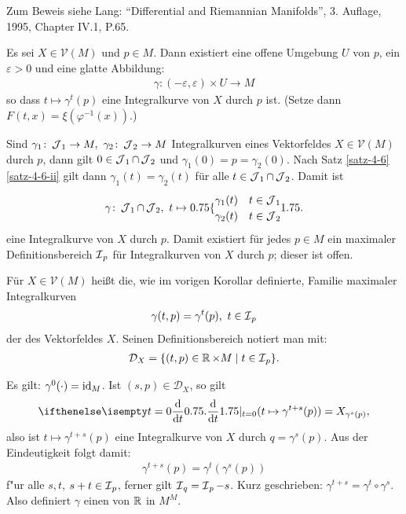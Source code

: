 Zum Beweis siehe Lang: "`Differential and Riemannian Manifolds"', 3. Auflage, 1995, Chapter IV.1, P.65\cite{lang1995differential}.

\begin{Kor}\label{korollar-4-7}
  Es sei $X \in \mathcal V(M)$ und $p \in M$. Dann existiert eine offene Umgebung $U$ von $p$, ein $\varepsilon > 0$ und eine glatte Abbildung:
  \begin{align*}
    \gamma\colon(-\varepsilon,\varepsilon) \times U \to M
  \end{align*}
  so dass $t \mapsto \gamma^t(p)$ eine Integralkurve von $X$ durch $p$ ist. (Setze dann $F(t,x) = \xi(\varphi^{-1}(x))$.)
\end{Kor}

\begin{Kor}\label{korollar-4-8}
  Sind $\gamma_1 \colon \operatorname{\mathcal{J}}_1 \to M, \ \gamma_2 \colon \operatorname{\mathcal{J}}_2 \to M$ Integralkurven eines Vektorfeldes $X \in \mathcal V(M)$ durch $p$, dann gilt $0 \in \operatorname{\mathcal{J}}_1 \cap \operatorname{\mathcal{J}}_2$ und $\gamma_1(0)= p = \gamma_2(0)$.
  Nach Satz \ref{satz-4-6} \ref{satz-4-6-ii} gilt dann $\gamma_1(t) = \gamma_2(t)$ für alle $t \in \operatorname{\mathcal{J}}_1 \cap \operatorname{\mathcal{J}}_2$. Damit ist
  \begin{align*}
    \gamma \colon \calJ_1 \cap \calJ_2, \ t \mapsto 
    \begin{cases}
      \gamma_1(t) & t \in \calJ_1\\
      \gamma_2(t) & t \in \calJ_2
    \end{cases}
  \end{align*}
  eine Integralkurve von $X$ durch $p$.
  Damit existiert für jedes $p \in M$ ein maximaler Definitionsbereich $\operatorname{\mathcal{I}}_p$ für Integralkurven von $X$ durch $p$; dieser ist offen.
\end{Kor}

\begin{dfn}
  Für $X \in \mathcal V(M)$ heißt die, wie im vorigen Korollar definierte, Familie maximaler Integralkurven
  \begin{align*}
    \gamma(t,p) = \gamma^t(p),\ t \in \operatorname{\mathcal{I}}_p
  \end{align*}
  der  des Vektorfeldes $X$.
  Seinen Definitionsbereich notiert man mit:
  \begin{align*}
    \mathcal D_X = \{(t,p) \in \operatorname{\mathbb{R}} \times M \mid t \in \operatorname{\mathcal{I}}_p\}.
  \end{align*}
\end{dfn}

\begin{bem}
  Es gilt: $\gamma^0(\cdot) = \operatorname{id}_M$. Ist $(s,p) \in \mathcal D_{X}$, so gilt
  \[ \difffrac[t=0]{}{t}(t \mapsto \gamma^{t+s}(p)) = X_{\gamma^s(p)}, \]
  also ist $t \mapsto \gamma^{t+s}(p)$ eine Integralkurve von $X$ durch $q = \gamma^s(p)$. Aus der Eindeutigkeit folgt damit:
  \begin{align*}
    \gamma^{t+s}(p) = \gamma^t(\gamma^s(p))
  \end{align*}
  f"ur alle $s, t$, $s+t \in \operatorname{\mathcal{I}}_p$, ferner gilt $\operatorname{\mathcal{I}}_q = \operatorname{\mathcal{I}}_p - s$. Kurz geschrieben: $\gamma^{t+s} = \gamma^t \circ \gamma^s$. Also definiert $\gamma$ einen  von $\operatorname{\mathbb{R}}$ in $M^M$.
\end{bem}

